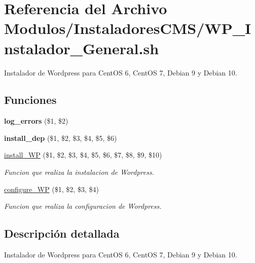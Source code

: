 \hypertarget{WP__Instalador__General_8sh}{}\section{Referencia del Archivo Modulos/\+Instaladores\+C\+M\+S/\+W\+P\+\_\+\+Instalador\+\_\+\+General.sh}
\label{WP__Instalador__General_8sh}


Instalador de Wordpress para Cent\+OS 6, Cent\+OS 7, Debian 9 y Debian 10.  


\subsection*{Funciones}
\begin{DoxyCompactItemize}
\item 
\mbox{\label{WP__Instalador__General_8sh_a92067b58a8478c9841b2cd9b75ea3565}} 
{\bfseries log\+\_\+errors} (\$1, \$2)
\item 
\mbox{\label{WP__Instalador__General_8sh_a0def5b6b697b8869c4772673d56a5a4a}} 
{\bfseries install\+\_\+dep} (\$1, \$2, \$3, \$4, \$5, \$6)
\item 
\hyperlink{WP__Instalador__General_8sh_abb84488e94ed8fa0eff09a789a9e42ca}{install\+\_\+\+WP} (\$1, \$2, \$3, \$4, \$5, \$6, \$7, \$8, \$9, \$10)
\begin{DoxyCompactList}\small\item\em Funcion que realiza la instalacion de Wordpress. \end{DoxyCompactList}\item 
\hyperlink{WP__Instalador__General_8sh_abd32b653a68475c7994f69226c32d530}{configure\+\_\+\+WP} (\$1, \$2, \$3, \$4)
\begin{DoxyCompactList}\small\item\em Funcion que realiza la configuracion de Wordpress. \end{DoxyCompactList}\end{DoxyCompactItemize}


\subsection{Descripción detallada}
Instalador de Wordpress para Cent\+OS 6, Cent\+OS 7, Debian 9 y Debian 10. 

